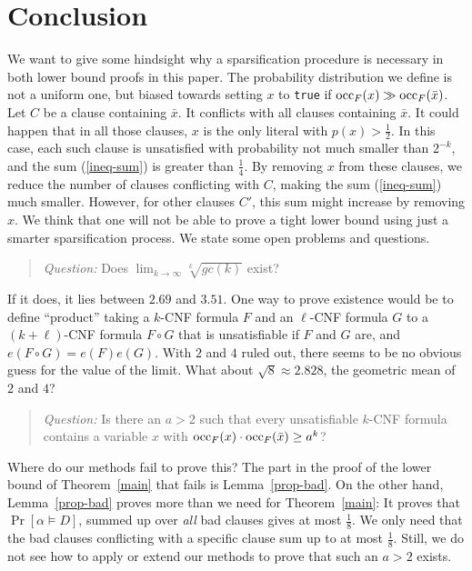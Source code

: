 \documentclass[a4paper, 11pt]{article}
\newcommand{\occ}{\ensuremath{{\rm{occ}}}}
\begin{document}
\section{Conclusion}

We want to give some hindsight why a sparsification procedure is
necessary in both lower bound proofs in this paper.  The probability
distribution we define is not a uniform one, but biased towards
setting $x$ to \texttt{true} if $\occ_F(x) \gg \occ_F(\bar{x})$.  Let
$C$ be a clause containing $\bar{x}$. It conflicts with all clauses
containing $\bar{x}$. It could happen that in all those clauses, $x$
is the only literal with $p(x) > \frac{1}{2}$. In this case, each such
clause is unsatisfied with probability not much smaller than $2^{-k}$,
and the sum (\ref{ineq-sum}) is greater than $\frac{1}{4}$. By
removing $x$ from these clauses, we reduce the number of clauses
conflicting with $C$, making the sum (\ref{ineq-sum}) much smaller.
However, for other clauses $C'$, this sum might increase by removing
$x$. We think that one will not be able to prove a tight lower bound
using just a smarter sparsification process. We state some open
problems and questions.

\begin{quotation}
{\em Question:} Does $\lim_{k \rightarrow \infty} \sqrt[k]{gc(k)}$ exist?
\end{quotation}

If it does, it lies between $2.69$ and $3.51$. One way to prove
existence would be to define ``product'' taking a $k$-CNF formula $F$
and an $\ell$-CNF formula $G$ to a $(k+\ell)$-CNF formula $F \circ G$
that is unsatisfiable if $F$ and $G$ are, and $e(F \circ G) =
e(F)e(G)$. With $2$ and $4$ ruled out, there seems to be no obvious
guess for the value of the limit. What about $\sqrt{8}\approx 2.828$,
the geometric mean of $2$ and $4$? 

\begin{quotation}
  {\em Question:} Is there an $a > 2$ such that every unsatisfiable
  $k$-CNF formula contains a variable $x$ with $\occ_F(x) \cdot
  \occ_F(\bar{x}) \geq a^k$?
\end{quotation}

Where do our methods fail to prove this? The part in the proof of the
lower bound of Theorem~\ref{main} that fails is Lemma~\ref{prop-bad}.
On the other hand, Lemma~\ref{prop-bad} proves more than we need for
Theorem~\ref{main}: It proves that $\Pr[\alpha \models D]$, summed up
over {\em all} bad clauses gives at most $\frac{1}{8}$. We only need
that the bad clauses conflicting with a specific clause sum up to at
most $\frac{1}{8}$. Still, we do not see how to apply or extend our
methods to prove that such an $a > 2$ exists.\\
\end{document}
